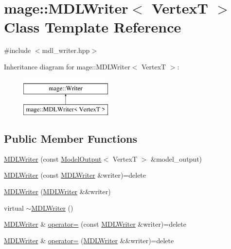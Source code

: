 \hypertarget{classmage_1_1_m_d_l_writer}{}\section{mage\+:\+:M\+D\+L\+Writer$<$ VertexT $>$ Class Template Reference}
\label{classmage_1_1_m_d_l_writer}


{\ttfamily \#include $<$mdl\+\_\+writer.\+hpp$>$}

Inheritance diagram for mage\+:\+:M\+D\+L\+Writer$<$ VertexT $>$\+:\begin{figure}[H]
\begin{center}
\leavevmode
\includegraphics[height=2.000000cm]{classmage_1_1_m_d_l_writer}
\end{center}
\end{figure}
\subsection*{Public Member Functions}
\begin{DoxyCompactItemize}
\item 
\hyperlink{classmage_1_1_m_d_l_writer_a7e5c6c9c9a9d32b09c5e17f4691e01c1}{M\+D\+L\+Writer} (const \hyperlink{structmage_1_1_model_output}{Model\+Output}$<$ VertexT $>$ \&model\+\_\+output)
\item 
\hyperlink{classmage_1_1_m_d_l_writer_ad244168d68c45fe7dcafa350c8a13fbe}{M\+D\+L\+Writer} (const \hyperlink{classmage_1_1_m_d_l_writer}{M\+D\+L\+Writer} \&writer)=delete
\item 
\hyperlink{classmage_1_1_m_d_l_writer_a21512d36a1e88eefa5f77fa7ee74753c}{M\+D\+L\+Writer} (\hyperlink{classmage_1_1_m_d_l_writer}{M\+D\+L\+Writer} \&\&writer)
\item 
virtual \hyperlink{classmage_1_1_m_d_l_writer_a8ec899d031d513eedf3345b78361d0de}{$\sim$\+M\+D\+L\+Writer} ()
\item 
\hyperlink{classmage_1_1_m_d_l_writer}{M\+D\+L\+Writer} \& \hyperlink{classmage_1_1_m_d_l_writer_ac8f4db1bc43a8fe4842409671505b49b}{operator=} (const \hyperlink{classmage_1_1_m_d_l_writer}{M\+D\+L\+Writer} \&writer)=delete
\item 
\hyperlink{classmage_1_1_m_d_l_writer}{M\+D\+L\+Writer} \& \hyperlink{classmage_1_1_m_d_l_writer_ac5c21784110691e24d84d6c241a2e5f6}{operator=} (\hyperlink{classmage_1_1_m_d_l_writer}{M\+D\+L\+Writer} \&\&writer)=delete
\end{DoxyCompactItemize}
